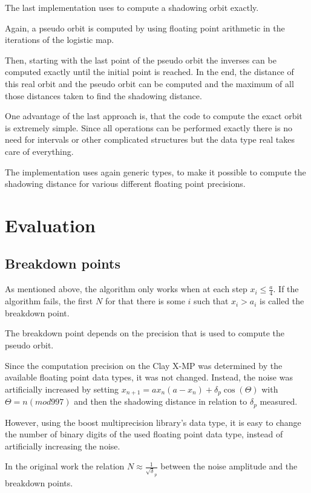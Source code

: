  The last implementation uses \irram to compute a shadowing orbit exactly.

  Again, a pseudo orbit is computed by using floating point arithmetic in the
  iterations of the logistic map.

  Then, starting with the last point of the pseudo orbit the inverses can be computed exactly until the initial point is reached.
  In the end, the distance of this real orbit and the pseudo orbit can be computed and the maximum of all those distances taken to find the shadowing distance.

  One advantage of the last approach is, that the \irram code to compute the exact orbit is extremely simple. 
  Since all operations can be performed exactly there is no need for intervals
  or other complicated structures but the data type real takes care of
  everything.

  The implementation uses again generic types, to make it possible to compute
  the shadowing distance for various different floating point precisions.
\section{Evaluation}
  \subsection{Breakdown points}
  As mentioned above, the algorithm only works when at each step $x_i \leq
  \frac{a}{4}.$ 
  If the algorithm fails, the first $N$ for that there is some $i$ such that
  $x_i > a_i$ is called the breakdown point.

  The breakdown point depends on the precision that is used to compute the pseudo orbit. 

  Since the computation precision on the Clay X-MP was determined by the available floating point data types, it was not changed.
  Instead, the noise was artificially increased by setting $x_{n+1} =
  ax_n(a-x_n)+\delta_p \cos (\Theta)$ with $\Theta = n (mod 997)$ and then the
  shadowing distance in relation to $\delta_p$ measured.  
  
  However, using the boost multiprecision library's  data
  type, it is easy to change the number of binary digits of the used floating
  point data type, instead of artificially increasing the noise.

  In the original work the relation $N \approx \frac{1}{\sqrt \delta_p}$
  between the noise amplitude and the breakdown points.

